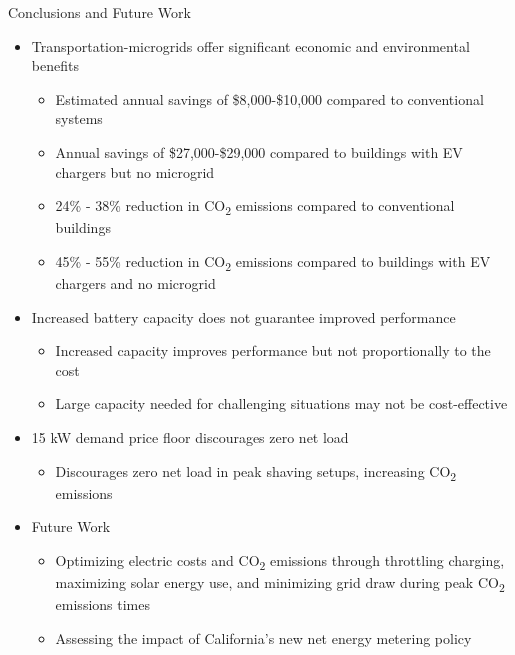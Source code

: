 \documentclass[final, 20 pt]{beamer}
\newlength{\onecolwid}
\begin{document}
\begin{frame}[t]
\begin{columns}[t]
\begin{column}{\onecolwid}
\begin{block}{Conclusions and Future Work}
	\begin{itemize} 
		\item Transportation-microgrids offer significant economic and environmental benefits
		\begin{itemize} 
			\item Estimated annual savings of \$8,000-\$10,000 compared to conventional systems
			\item Annual savings of \$27,000-\$29,000 compared to buildings with EV chargers but no microgrid
			\item 24\% - 38\% reduction in CO\textsubscript{2} emissions compared to conventional buildings
			\item 45\% - 55\% reduction in CO\textsubscript{2} emissions compared to buildings with EV chargers and no microgrid
		\end{itemize}
		\item Increased battery capacity does not guarantee improved performance
		\begin{itemize} 
			\item Increased capacity improves performance but not proportionally to the cost
			\item Large capacity needed for challenging situations may not be cost-effective 
		\end{itemize}
		\item 15 kW demand price floor discourages zero net load
		\begin{itemize} 
			\item Discourages zero net load in peak shaving setups, increasing CO\textsubscript{2} emissions
		\end{itemize}
		\item Future Work
		\begin{itemize} 
			\item Optimizing electric costs and CO\textsubscript{2} emissions through throttling charging, maximizing solar energy use, and minimizing grid draw during peak CO\textsubscript{2} emissions times
			\item Assessing the impact of California's new net energy metering policy
		\end{itemize}
	\end{itemize}
\end{block}




\end{column}
\end{columns}
\end{frame}
\end{document}
